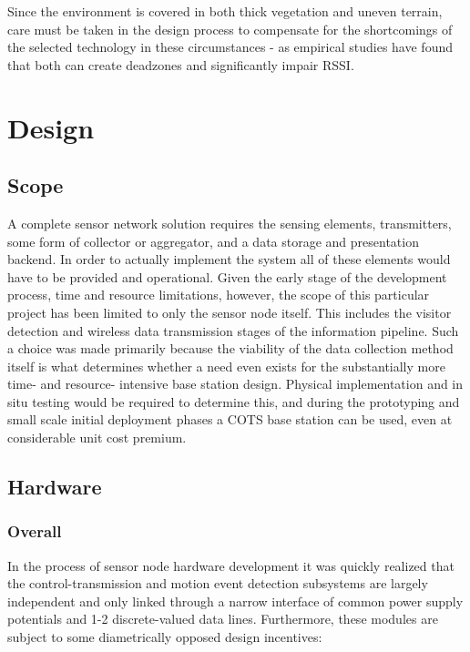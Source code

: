\documentclass[10pt,nocopyrightspace]{ewsn-proc}
\begin{document}
Since the environment is covered in both thick vegetation and uneven terrain, care must be taken in the design process to compensate for the shortcomings of the selected technology in these circumstances - as empirical studies have found\cite{LORAWAN-hills} that both can create deadzones and significantly impair RSSI.


\section{Design}

\subsection{Scope}
A complete sensor network solution requires the sensing elements, transmitters, some form of collector or aggregator, and a data storage and presentation backend. In order to actually implement the system all of these elements would have to be provided and operational. Given the early stage of the development process, time and resource limitations, however, the scope of this particular project has been limited to only the sensor node itself. This includes the visitor detection and wireless data transmission stages of the information pipeline. Such a choice was made primarily because the viability of the data collection method itself is what determines whether a need even exists for the substantially more time- and resource- intensive base station design. Physical implementation and in situ testing would be required to determine this, and during the prototyping and small scale initial deployment phases a COTS base station can be used, even at considerable unit cost premium.


\subsection{Hardware}


\subsubsection{Overall}
In the process of sensor node hardware development it was quickly realized that the control-transmission and motion event detection subsystems are largely independent and only linked through a narrow interface of common power supply potentials and 1-2 discrete-valued data lines. Furthermore, these modules are subject to some diametrically opposed design incentives:
\end{document}
